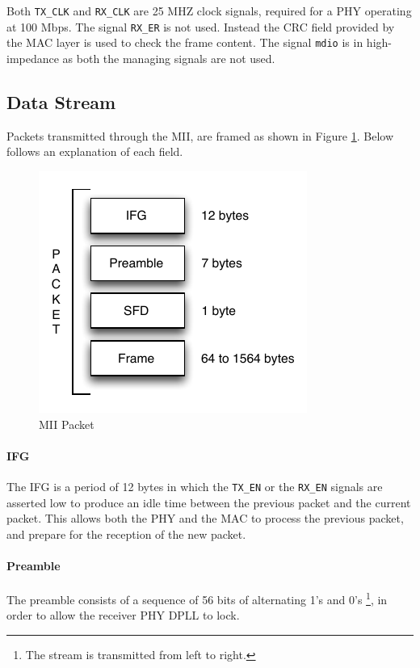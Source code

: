 \documentclass[defaultstyle,10pt,master,Helvetica]{thesis}
\begin{document}
Both \texttt{TX\_CLK} and \texttt{RX\_CLK} are 25 MHZ clock signals, required for a \ac{PHY} operating at 100 Mbps. The signal \texttt{RX\_ER} is not used. Instead the \ac{CRC} field provided by the \ac{MAC} layer is used to check the frame content. The signal \texttt{mdio} is in high-impedance as both the managing signals are not used.




\clearpage
\subsection{Data Stream}

Packets transmitted through the \ac{MII}, are framed as shown in Figure \ref{fig:MII-frame}. Below follows an explanation of each field.

\begin{figure}[h]
  \centering
      \includegraphics[scale=1.25,center]{Diagrams/MII-packet.pdf}
  \caption{\ac{MII} Packet}\label{fig:MII-frame}
\end{figure}

\paragraph*{IFG} The \ac{IFG} is a period of 12 bytes in which the \texttt{TX\_EN} or the \texttt{RX\_EN} signals are asserted low to produce an idle time between the previous packet and the current packet. This allows both the \ac{PHY} and the \ac{MAC} to process the previous packet, and prepare for the reception of the new packet.

\paragraph*{Preamble} The preamble consists of a sequence of 56 bits of alternating 1's and 0's \footnote{The stream is transmitted from left to right.}, in order to allow the receiver \ac{PHY} \ac{DPLL} to lock.
\end{document}
